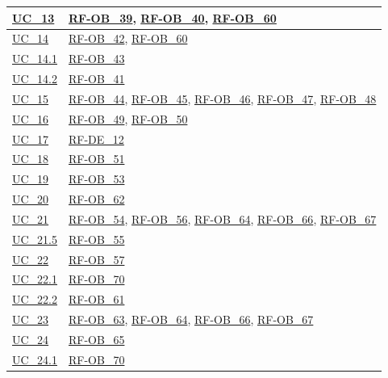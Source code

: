 \begin{longtable}{|>{\raggedright}p{}|>{\raggedright\arraybackslash}p{}|}
    \hline
    \hyperref[uc_13]{UC\_13} & \hyperlink{rf-ob_39}{RF-OB\_39}, \hyperlink{rf-ob_40}{RF-OB\_40}, \hyperlink{rf-ob_60}{RF-OB\_60} \\
    \hline
    \hyperref[uc_14]{UC\_14} & \hyperlink{rf-ob_42}{RF-OB\_42}, \hyperlink{rf-ob_60}{RF-OB\_60} \\
    \hline
    \hyperref[uc_14.1]{UC\_14.1} & \hyperlink{rf-ob_43}{RF-OB\_43} \\
    \hline
    \hyperref[uc_14.2]{UC\_14.2} & \hyperlink{rf-ob_41}{RF-OB\_41} \\
    \hline
    \hyperref[uc_15]{UC\_15} & \hyperlink{rf-ob_44}{RF-OB\_44}, \hyperlink{rf-ob_45}{RF-OB\_45}, \hyperlink{rf-ob_46}{RF-OB\_46}, \hyperlink{rf-ob_47}{RF-OB\_47}, \hyperlink{rf-ob_48}{RF-OB\_48} \\
    \hline
    \hyperref[uc_16]{UC\_16} & \hyperlink{rf-ob_49}{RF-OB\_49}, \hyperlink{rf-ob_50}{RF-OB\_50} \\
    \hline
    \hyperref[uc_17]{UC\_17} & \hyperlink{rf-de_12}{RF-DE\_12} \\
    \hline
    \hyperref[uc_18]{UC\_18} & \hyperlink{rf-ob_51}{RF-OB\_51} \\
    \hline
    \hyperref[uc_19]{UC\_19} & \hyperlink{rf-ob_53}{RF-OB\_53} \\
    \hline
    \hyperref[uc_20]{UC\_20} & \hyperlink{rf-ob_62}{RF-OB\_62} \\
    \hline
    \hyperref[uc_21]{UC\_21} & \hyperlink{rf-ob_54}{RF-OB\_54}, \hyperlink{rf-ob_56}{RF-OB\_56}, \hyperlink{rf-ob_64}{RF-OB\_64}, \hyperlink{rf-ob_66}{RF-OB\_66}, \hyperlink{rf-ob_67}{RF-OB\_67} \\
    \hline
    \hyperref[uc_21.5]{UC\_21.5} & \hyperlink{rf-ob_55}{RF-OB\_55} \\
    \hline
    \hyperref[uc_22]{UC\_22} & \hyperlink{rf-ob_57}{RF-OB\_57} \\
    \hline
    \hyperref[uc_22.1]{UC\_22.1} & \hyperlink{rf-ob_70}{RF-OB\_70} \\
    \hline
    \hyperref[uc_22.2]{UC\_22.2} & \hyperlink{rf-ob_61}{RF-OB\_61} \\
    \hline
    \hyperref[uc_23]{UC\_23} & \hyperlink{rf-ob_63}{RF-OB\_63}, \hyperlink{rf-ob_64}{RF-OB\_64}, \hyperlink{rf-ob_66}{RF-OB\_66}, \hyperlink{rf-ob_67}{RF-OB\_67} \\
    \hline
    \hyperref[uc_24]{UC\_24} & \hyperlink{rf-ob_65}{RF-OB\_65} \\
    \hline
    \hyperref[uc_24.1]{UC\_24.1} & \hyperlink{rf-ob_70}{RF-OB\_70} \\

\end{longtable}
